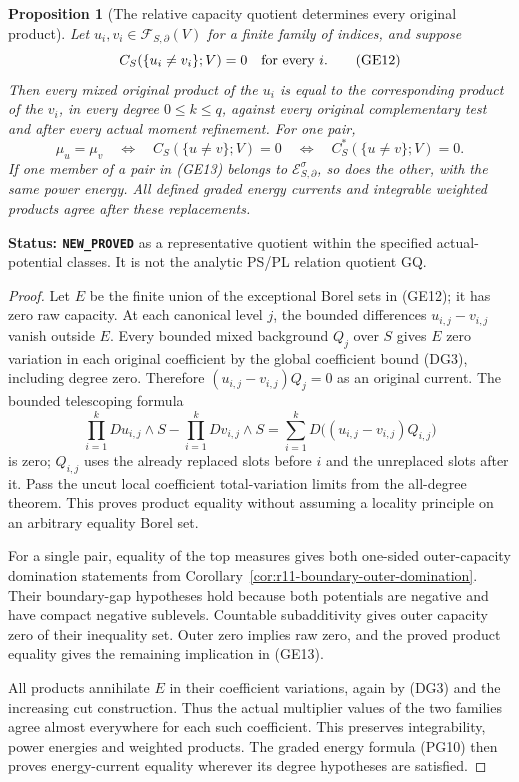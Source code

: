 \documentclass[11pt,a4paper]{article}
\numberwithin{equation}{section}
\newtheorem{proposition}[theorem]{Proposition}
\theoremstyle{definition}
\theoremstyle{remark}
\begin{document}
\begin{proposition}[The relative capacity quotient determines every original product]
\label{prop:r11-capacity-representative-quotient}
Let $u_i,v_i\in\mathcal F_{S,\partial}(V)$ for a finite
family of indices, and suppose
\[
       C_S(\{u_i\ne v_i\};V)=0\quad\hbox{for every }i.
 \tag{GE12}
\]
Then every mixed original product of the $u_i$ is equal to
the corresponding product of the $v_i$, in every degree
$0\leq k\leq q$, against every original complementary test
and after every actual moment refinement. For one pair,
\[
 \mu_u=\mu_v
  \quad\Longleftrightarrow\quad C_S(\{u\ne v\};V)=0
  \quad\Longleftrightarrow\quad C_S^*(\{u\ne v\};V)=0.
 \tag{GE13}
\]
If one member of a pair in (GE13) belongs to
$\mathcal E^\sigma_{S,\partial}$, so does the other, with
the same power energy. All defined graded energy currents
and integrable weighted products agree after these replacements.
\end{proposition}

\noindent\textbf{Status: \texttt{NEW\_PROVED}} as a
representative quotient within the specified actual-potential
classes. It is not the analytic PS/PL relation quotient GQ.

\begin{proof}
Let $E$ be the finite union of the exceptional Borel sets in
(GE12); it has zero raw capacity. At each canonical level $j$,
the bounded differences $u_{i,j}-v_{i,j}$ vanish outside $E$.
Every bounded mixed background $Q_j$ over $S$ gives $E$ zero
variation in each original coefficient by the global
coefficient bound (DG3), including degree zero. Therefore
$(u_{i,j}-v_{i,j})Q_j=0$ as an original current. The bounded
telescoping formula
\[
 \prod_{i=1}^k Du_{i,j}\wedge S-
 \prod_{i=1}^k Dv_{i,j}\wedge S
       =\sum_{i=1}^k D\bigl((u_{i,j}-v_{i,j})Q_{i,j}\bigr)
 \tag{GE14}
\]
is zero; $Q_{i,j}$ uses the already replaced slots before
$i$ and the unreplaced slots after it. Pass the uncut local
coefficient total-variation limits from the all-degree theorem.
This proves product equality without assuming a locality
principle on an arbitrary equality Borel set.

For a single pair, equality of the top measures gives both
one-sided outer-capacity domination statements from
Corollary~\ref{cor:r11-boundary-outer-domination}. Their
boundary-gap hypotheses hold because both potentials are
negative and have compact negative sublevels. Countable
subadditivity gives outer capacity zero of their inequality
set. Outer zero implies raw zero, and the proved product
equality gives the remaining implication in (GE13).

All products annihilate $E$ in their coefficient variations,
again by (DG3) and the increasing cut construction. Thus
the actual multiplier values of the two families agree
almost everywhere for each such coefficient. This preserves
integrability, power energies and weighted products.
The graded energy formula (PG10) then proves energy-current
equality wherever its degree hypotheses are satisfied.
\end{proof}
\end{document}
